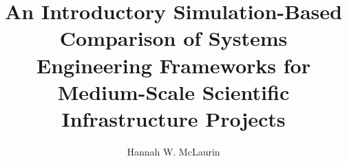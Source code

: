 \documentclass[master]{thesis}
\title{An Introductory Simulation-Based Comparison of Systems Engineering Frameworks for Medium-Scale Scientific Infrastructure Projects}
\author{Hannah W. McLaurin}
\begin{document}
 
\frontmatter
\maketitle
\makeabstract
\makeacknowledgements
\newpage
\tableofcontents
\listoftables
\listoffigures
\mainmatter

\clearpage

\clearpage

\clearpage

\clearpage

\clearpage
\backmatter
\clearpage


\clearpage
\appendix
\clearpage
\end{document}
